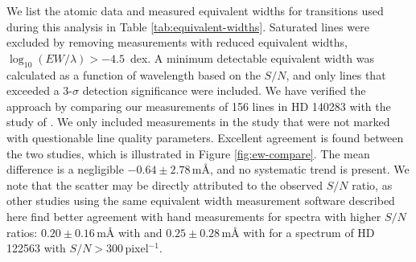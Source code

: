 \documentclass{emulateapj}
\begin{document}
We list the atomic data and measured equivalent widths for transitions used during this analysis in Table \ref{tab:equivalent-widths}. Saturated lines were excluded by removing measurements with reduced equivalent widths, $\log_{10}{(EW/\lambda)} > -4.5$\, dex. A minimum detectable equivalent width was calculated as a function of wavelength based on the $S/N$, and only lines that exceeded a 3-$\sigma$ detection significance were included. We have verified the approach by comparing our measurements of 156 lines in HD 140283 with the study of \citet{norris;et-al_1996}. We only included measurements in the \citet{norris;et-al_1996} study that were not marked with questionable line quality parameters. Excellent agreement is found between the two studies, which is illustrated in Figure \ref{fig:ew-compare}. The mean difference is a negligible $-0.64 \pm 2.78$\,m\AA{}, and no systematic trend is present. We note that the scatter may be directly attributed to the observed $S/N$ ratio, as other studies \citep{frebel;et-al_2013} using the same equivalent width measurement software described here find better agreement with hand measurements for spectra with higher $S/N$ ratios: $0.20 \pm 0.16$\,m{\AA} with \citet{aoki;et-al_2007} and $0.25 \pm 0.28$\,m{\AA} with \citet{cayrel;et-al_2004} for a spectrum of HD 122563 with $S/N > 300$\,pixel$^{-1}$.
\end{document}
